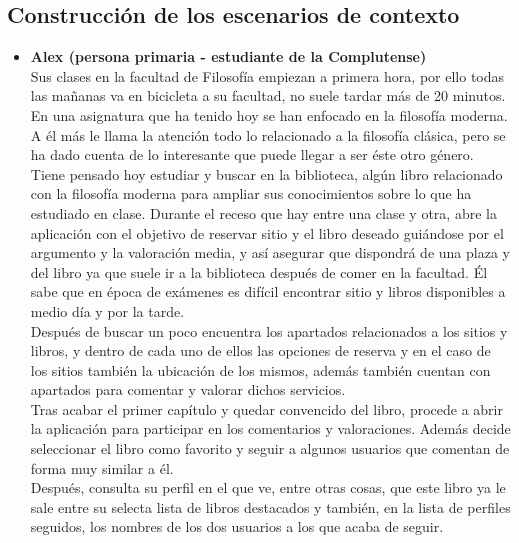 \documentclass[12pt]{article}
\begin{document}
\subsection{Construcción de los escenarios de contexto}
\begin{itemize}[noitemsep]

\item \textbf{Alex (persona primaria - estudiante de la Complutense)} \\
Sus clases en la facultad de Filosofía empiezan a primera hora, por ello todas las mañanas va en bicicleta a su facultad, no suele tardar más de 20 minutos.\\ 

En una asignatura que ha tenido hoy se han enfocado en la filosofía moderna. A él más le llama la atención todo lo relacionado a la filosofía clásica, pero se ha dado cuenta de lo interesante que puede llegar a ser éste otro género.\\

Tiene pensado hoy estudiar y buscar en la biblioteca, algún libro relacionado con la filosofía moderna para ampliar sus conocimientos sobre lo que ha estudiado en clase.
Durante el receso que hay entre una clase y otra, abre la aplicación con el objetivo de reservar sitio y el libro deseado guiándose por el argumento y la valoración media, y así asegurar que dispondrá de una plaza y del libro ya que suele ir a la biblioteca después de comer en la facultad. Él sabe que en época de exámenes es difícil encontrar sitio y libros disponibles a medio día y por la tarde.\\

Después de buscar un poco encuentra los apartados relacionados a los sitios y libros, y dentro de cada uno de ellos las opciones de reserva y en el caso de los sitios también la ubicación de los mismos, además también cuentan con apartados para comentar y valorar  dichos servicios.\\
	
Tras acabar el primer capítulo y quedar convencido del libro, procede a abrir la aplicación para participar en los comentarios y valoraciones. Además decide seleccionar el libro como favorito y seguir a algunos usuarios que comentan de forma muy similar a él.\\

Después, consulta su perfil en el que ve, entre otras cosas, que este libro ya le sale entre su selecta lista de libros destacados y también, en la lista de perfiles seguidos, los
nombres de los dos usuarios a los que acaba de seguir.\\


\end{itemize}
\end{document}
